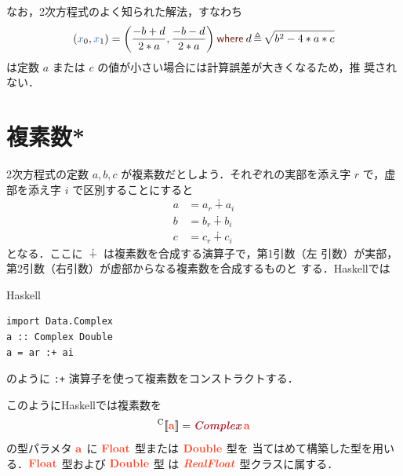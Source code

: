 \documentclass[a5paper,twoside,fleqn,draft]{jsbook}
\def\[{[\![}
\def\]{]\!]}
\def\keywordColor{Sepia}
\def\varColor{NavyBlue}
\def\typeColor{RedOrange}
\def\typeConstColor{Maroon}
\newcommand{\programminglanguage}[1]{\textsf{#1}}
\newcommand{\haskell}{\programminglanguage{Haskell}}
\newcommand{\code}[1]{\texttt{#1}}
\newenvironment{haskellcode}{\begin{itembox}[r]{\haskell}}{\end{itembox}}
\newcommand{\mKeyword}[1]{\textcolor{\keywordColor}{\mathsf{#1}}}
\newcommand{\mWhereKeyword}{\mKeyword{where}}
\newcommand{\mTypeConstructor}[1]{\textcolor{\typeConstColor}{\textbf{\textit{#1}}}}
\newcommand{\mVar}[1]{\textcolor{\varColor}{#1}}
\newcommand{\mXVar}{\mVar{x}}
\DeclareMathOperator{\mComplexPlus}{\dotplus}
\DeclareMathOperator{\mLetEq}{\triangleq}
\newcommand{\mType}[1]{\textcolor{\typeColor}{\mathbf{#1}}}
\newcommand{\mA}{\mType{a}}
\newcommand{\mFloatType}{\mType{Float}}
\newcommand{\mDoubleType}{\mType{Double}}
\newcommand{\mTypeAssemble}[2]{{}^\mathrm{#1}\[\mType{#2}\]}
\newcommand{\mCompFunclexType}[1]{\mTypeAssemble{C}{#1}} %
\newcommand{\mTypeClass}[1]{\textcolor{\typeColor}{\textbf{\textit{#1}}}}
\newcommand{\mRealFloatTypeClass}{\mTypeClass{RealFloat}}
\newcommand{\mWhereIsEXP}[2]{\mathbin{\mWhereKeyword}#1\mLetEq#2} %
\begin{document}
なお，2次方程式のよく知られた解法，すなわち
\begin{equation}
  (\mXVar_0,\mXVar_1)=\left(\frac{-b+d}{2*a},\frac{-b-d}{2*a}\right)
  \mWhereIsEXP{d}{\sqrt{b^2-4*a*c}}
\end{equation}
は定数 $a$ または $c$ の値が小さい場合には計算誤差が大きくなるため，推
奨されない．

\section{複素数*}


2次方程式の定数 $a,b,c$ が複素数だとしよう．それぞれの実部を添え字 $r$
で，虚部を添え字 $i$ で区別することにすると
\begin{align}
a&=a_r\mComplexPlus a_i\\
b&=b_r\mComplexPlus b_i\\
c&=c_r\mComplexPlus c_i
\end{align}
となる．ここに $\mComplexPlus$ は複素数を合成する演算子で，第1引数（左
  引数）が実部，第2引数（右引数）が虚部からなる複素数を合成するものと
する．\haskell では
\begin{haskellcode}
\begin{verbatim}
import Data.Complex
a :: Complex Double
a = ar :+ ai
\end{verbatim}
\end{haskellcode}
のように \code{:+} 演算子を使って複素数をコンストラクトする．

このように\haskell では複素数を
\begin{equation}
  \mCompFunclexType{a}=\mathop{\mTypeConstructor{Complex}}\mA
\end{equation}
の型パラメタ $\mA $ に $\mFloatType$ 型または $\mDoubleType$ 型を
当てはめて構築した型を用いる．$\mFloatType$ 型および $\mDoubleType$ 型
は $\mRealFloatTypeClass$ 型クラスに属する．
\end{document}
